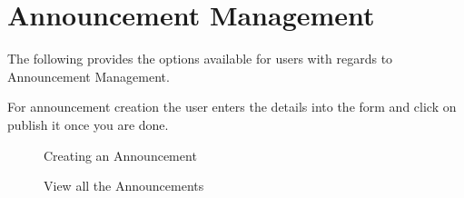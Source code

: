 \documentclass[12pt]{article}
\begin{document}
\newpage
\section{Announcement Management}
The following provides the options available for users with regards to Announcement Management.

For announcement creation the user enters the details into the form and click on publish it once you are done.
\begin{figure}[H]
\centering	
{}
\caption{Creating an Announcement}
\end{figure}

\begin{figure}[H]
\centering	
{}
\caption{View all the Announcements}
\end{figure}
\end{document}
